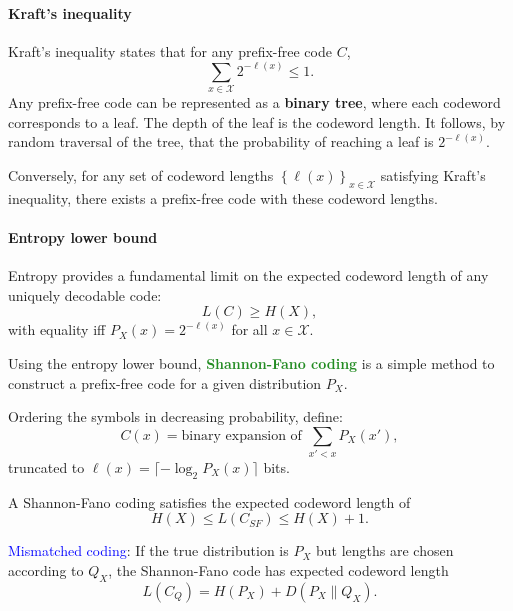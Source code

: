 \paragraph{Kraft's inequality}
{Kraft's inequality} states that for any prefix-free code $C$,
\[\sum_{x\in \mathcal{X}} 2^{-\ell(x)}\le 1.\]
Any prefix-free code can be \textcolor{Bittersweet}{represented as a
\textbf{binary tree}}, where each codeword corresponds to a leaf. The depth of
the leaf is the codeword length. It follows, by random traversal of the tree,
that the \textcolor{Bittersweet}{probability of reaching a leaf is
$2^{-\ell(x)}$}.

Conversely, for any set of codeword lengths $\left\{\ell(x)\right\}_{x\in
\mathcal{X}}$ satisfying Kraft's inequality, there exists a prefix-free code
with these codeword lengths.

\paragraph{Entropy lower bound}
Entropy provides a fundamental \textcolor{Bittersweet}{limit on the expected
codeword length} of any uniquely decodable code:
\[L(C)\ge H(X),\]
with equality iff ${P_X(x)}=2^{-\ell(x)}$ for all $x\in \mathcal{X}$.

Using the entropy lower bound, \textcolor{ForestGreen}{\textbf{Shannon-Fano
coding}} is a simple method to construct a \textcolor{Bittersweet}{prefix-free
code for a given distribution} $P_X$.

Ordering the symbols in decreasing probability, define:
\[C(x)=\text{binary expansion of }\sum_{x'<x} P_X(x'),\]
truncated to $\ell(x)=\lceil -\log_2{P_X(x)}\rceil$ bits.

A Shannon-Fano coding satisfies the \textcolor{Bittersweet}{expected codeword
length} of
\[H(X)\le L(C_{SF})\le H(X)+1.\] 

\textcolor{Blue}{Mismatched coding}: If the true distribution is $P_X$ but
\textcolor{Bittersweet}{lengths are chosen according to $Q_X$}, the
Shannon-Fano code has expected codeword length
\[L(C_Q)=H(P_X)+D(P_X\|Q_X).\]

